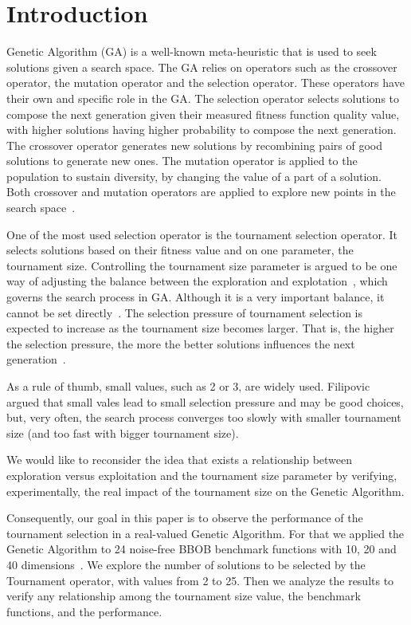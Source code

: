 \section{Introduction}\label{intro}

 Genetic Algorithm (GA) is a well-known meta-heuristic that is used to seek solutions given a search space. The GA relies on operators such as the crossover operator, the mutation operator and the selection operator. These operators have their own and specific role in the GA. The selection operator selects solutions to compose the next generation given their measured fitness function quality value, with higher solutions having higher probability to compose the next generation. The crossover operator generates new solutions by recombining pairs of good solutions to generate new ones. The mutation operator is applied to the population to sustain diversity, by changing the value of a part of a solution. Both crossover and mutation operators are applied to explore new points in the search space~\cite{blickle1995mathematical}.

One of the most used selection operator is the tournament selection operator. It selects solutions based on their fitness value and on one parameter, the tournament size. Controlling the tournament size parameter is argued to be one way of adjusting the balance between the exploration and explotation~\cite{blickle1995mathematical}, which governs the search process in GA. Although it is a very important balance, it cannot be set directly~\cite{filipovic2012fine}. The selection pressure of tournament selection is expected to increase as the tournament size becomes larger. That is, the higher the selection pressure, the more the better solutions influences the next generation~\cite{miller1995genetic}. 

As a rule of thumb, small values, such as 2 or 3, are widely used. Filipovic~\cite{filipovic2012fine} argued that small vales lead to small selection pressure and may be good choices, but, very often, the search process converges too slowly with smaller tournament size (and too fast with bigger tournament size). 

 We would like to reconsider the idea that exists a relationship between exploration versus exploitation and the tournament size parameter by verifying, experimentally, the real impact of the tournament size on the Genetic Algorithm.
 
 Consequently, our goal in this paper is to observe the performance of the tournament selection in a real-valued Genetic Algorithm. For that we applied the Genetic Algorithm to 24 noise-free BBOB benchmark functions with 10, 20 and 40 dimensions~\cite{hansen2010real}. We explore the number of solutions to be selected by the Tournament operator, with values from 2 to 25. Then we analyze the results to verify any relationship among the tournament size value, the benchmark functions, and the performance.

